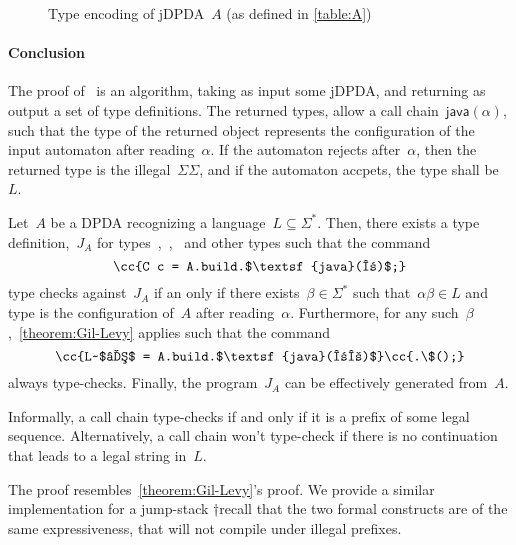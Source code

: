\begin{figure*}[htbp]
  \caption{\label{figure:A}Type encoding of jDPDA~$A$ (as defined in \cref{table:A})}
\end{figure*}

\paragraph*{Conclusion} The proof of~ is an algorithm, taking as input some jDPDA,
  and returning as output a set of \Java type definitions.
The returned types, allow a call chain~$\textsf{java}(\alpha)$,
  such that the type of the returned object represents the 
  configuration of the input automaton after reading~$\alpha$.
If the automaton rejects after~$\alpha$, then the returned type is the illegal~$\Sigma\Sigma$, 
  and if the automaton accpets, the type shall be~$L$.



\begin{Theorem}\label{theorem:Gil-Levy:2}
  Let~$A$ be a DPDA recognizing a language~$L⊆Σ^*$.
  Then, there exists a \Java type definition,~$J_A$ for types~,~,~ and
    other types such that the \Java command
  \begin{equation}
    \label{equation:prefix:result}
    \cc{C c = A.build.$\textsf{java}(α)$;}
  \end{equation}
    type checks against~$J_A$ if an only if there exists~$β∈Σ^*$ such
    that~$αβ∈L$ and type  is the configuration of~$A$ after reading~$α$.
  Furthermore, for any such~$β$,~\cref{theorem:Gil-Levy} applies such that the
  \Java command
  \begin{equation}
    \cc{L~$ℓ$ = A.build.$\textsf{java}(αβ)$}\cc{.\$();}
  \end{equation}
    always type-checks.
  Finally, the program~$J_A$ can be effectively generated from~$A$.
\end{Theorem}

Informally, a call chain type-checks if and only if it is a prefix
  of some legal sequence.
Alternatively, a call chain won't type-check if there is no
  continuation that leads to a legal string in~$L$.

The proof resembles~\cref{theorem:Gil-Levy}'s proof.
We provide a similar implementation for a jump-stack
  †{recall that the two formal constructs are of the same expressiveness},
  that will not compile under illegal prefixes.

